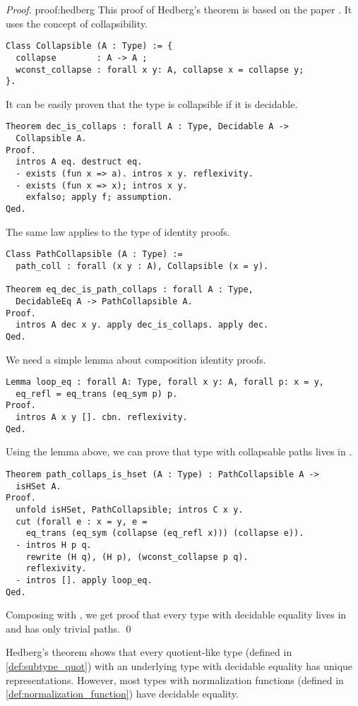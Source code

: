 \begin{proof}{}{proof:hedberg}
This proof of Hedberg's theorem is based on the paper \cite{HedbergProof}. It uses the concept of collapsibility.
\begin{verbatim}
Class Collapsible (A : Type) := { 
  collapse        : A -> A ;
  wconst_collapse : forall x y: A, collapse x = collapse y;
}.
\end{verbatim}
It can be easily proven that the type is collapsible if it is decidable.
\begin{verbatim}
Theorem dec_is_collaps : forall A : Type, Decidable A -> 
  Collapsible A.
Proof.
  intros A eq. destruct eq.
  - exists (fun x => a). intros x y. reflexivity.
  - exists (fun x => x); intros x y.
    exfalso; apply f; assumption.
Qed.
\end{verbatim}
The same law applies to the type of identity proofs.
\begin{verbatim}
Class PathCollapsible (A : Type) :=
  path_coll : forall (x y : A), Collapsible (x = y).

Theorem eq_dec_is_path_collaps : forall A : Type, 
  DecidableEq A -> PathCollapsible A.
Proof.
  intros A dec x y. apply dec_is_collaps. apply dec.
Qed.
\end{verbatim}
We need a simple lemma about composition identity proofs.
\begin{verbatim}
Lemma loop_eq : forall A: Type, forall x y: A, forall p: x = y, 
  eq_refl = eq_trans (eq_sym p) p.
Proof.
  intros A x y []. cbn. reflexivity.
Qed.
\end{verbatim}
Using the lemma above, we can prove that type with collapsable paths lives in .
\begin{verbatim}
Theorem path_collaps_is_hset (A : Type) : PathCollapsible A -> 
  isHSet A.
Proof.
  unfold isHSet, PathCollapsible; intros C x y.
  cut (forall e : x = y, e = 
    eq_trans (eq_sym (collapse (eq_refl x))) (collapse e)).
  - intros H p q. 
    rewrite (H q), (H p), (wconst_collapse p q).
    reflexivity.
  - intros []. apply loop_eq.
Qed.
\end{verbatim}
Composing  with , we get proof that every type with decidable equality lives in  and has only trivial paths. \qed
\end{proof}
Hedberg's theorem shows that every quotient-like type (defined in \ref{def:subtype_quot}) with an underlying type with decidable equality has unique representations. However, most types with normalization functions (defined in \ref{def:normalization_function}) have decidable equality.
